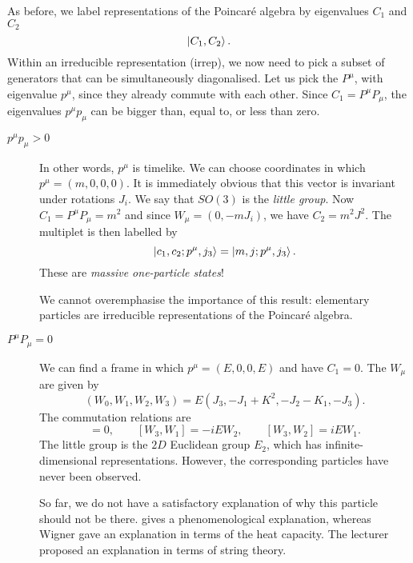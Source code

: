As before, we label representations of the Poincaré algebra by eigenvalues $C_1$ and $C_2$
\begin{equation}
  \ket{C_1, C_2}.
\end{equation}
Within an irreducible representation (irrep), we now need to pick a subset of generators that can be simultaneously diagonalised. Let us pick the $P^{\mu}$, with eigenvalue $p^{\mu}$, since they already commute with each other.
Since $C_1 = P^{\mu} P_{\mu}$, the eigenvalues $p^{\mu} p_{\mu}$ can be bigger than, equal to, or less than zero.
\begin{description}
  \item[$p^{\mu} p_{\mu}> 0$] In other words, $p^{\mu}$ is timelike. We can choose coordinates in which $p^{\mu} = (m, 0,0,0)$.
    It is immediately obvious that this vector is invariant under rotations $J_i$. We say that $SO(3)$ is the \emph{little group}.
    Now $C_1 = P^{\mu} P_{\mu} = m^2$ and since $W_{\mu} = (0, -m J_i)$, we have $C_2 = m^2 J^2$.
    The multiplet is then labelled by
    \begin{equation}
      \ket{c_1, c_2; p^{\mu}, j_3} = \ket{m, j; p^{\mu}, j_3}.
    \end{equation}
    These are \emph{massive one-particle states}!
    \begin{remark}
      We cannot overemphasise the importance of this result: elementary particles are irreducible representations of the Poincaré algebra.
    \end{remark}
  \item[$P^{\mu} P_{\mu} = 0$] We can find a frame in which $p^{\mu} = (E, 0, 0, E)$ and have $C_1 = 0$.
    The $W_{\mu}$ are given by
    \begin{equation}
      (W_0, W_1, W_2, W_3) = E(J_3, -J_1 + K^2, -J_2 -K_1, -J_3).
    \end{equation}
    The commutation relations are
    \begin{equation}
      [W_1, W_2] = 0, \qquad [W_3, W_1] = -i E W_2, \qquad [W_3, W_2]= i E W_1.
    \end{equation}
    The little group is the $2D$ Euclidean group $E_2$, which has infinite-dimensional representations. However, the corresponding particles have never been observed.
    \begin{remark}
      So far, we do not have a satisfactory explanation of why this particle should not be there.
      \cite{weinberg} gives a phenomenological explanation, whereas Wigner gave an explanation in terms of the heat capacity. The lecturer proposed an explanation in terms of string theory.

\end{remark}
\end{description}

